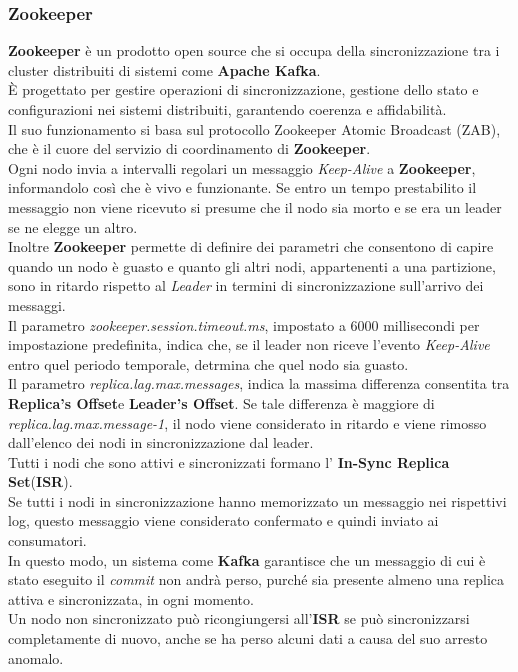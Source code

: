 \subsubsection{Zookeeper}
\textbf{Zookeeper} è un prodotto \gls{open source}{} che si occupa della sincronizzazione tra i cluster distribuiti di sistemi come \textbf{Apache Kafka}. \\
È progettato per gestire operazioni di sincronizzazione, gestione dello stato e configurazioni nei sistemi distribuiti, garantendo coerenza e affidabilità.\\
Il suo funzionamento si basa sul protocollo Zookeeper Atomic Broadcast (ZAB), che è il cuore del servizio di coordinamento di \textbf{Zookeeper}.\\
Ogni nodo invia a intervalli regolari un messaggio \textit{Keep-Alive} a \textbf{Zookeeper}, informandolo così che è vivo e funzionante. Se entro un tempo prestabilito il messaggio non viene ricevuto si presume che il nodo sia
morto e se era un leader se ne elegge un altro.\\
Inoltre \textbf{Zookeeper} permette di definire dei parametri che consentono di capire quando un nodo è guasto e quanto gli altri nodi, appartenenti a una partizione,  sono in ritardo rispetto al \textit{Leader} in termini di sincronizzazione sull'arrivo dei messaggi.\\
Il parametro \textit{zookeeper.session.timeout.ms}, impostato a 6000 millisecondi per impostazione predefinita, indica che, se il leader non riceve l'evento \textit{Keep-Alive} entro quel periodo temporale, detrmina che quel nodo sia guasto.\\
Il parametro \textit{replica.lag.max.messages}, indica la massima differenza consentita tra \textbf{Replica's Offset}e \textbf{Leader's Offset}. Se tale differenza è maggiore di \textit{replica.lag.max.message-1}, il nodo viene considerato in ritardo e viene rimosso dall'elenco dei nodi in sincronizzazione dal leader. \\
Tutti i nodi che sono attivi e sincronizzati formano l' \textbf{In-Sync Replica Set}(\textbf{ISR}).\\
Se tutti i nodi in sincronizzazione hanno memorizzato un messaggio nei rispettivi \gls{log}{}, questo messaggio viene considerato confermato e quindi inviato ai consumatori. \\
In questo modo, un sistema come \textbf{Kafka} garantisce che un messaggio di cui è stato eseguito il \textit{commit} non andrà perso, purché sia presente almeno una replica attiva e sincronizzata, in ogni momento.\\
Un nodo non sincronizzato può ricongiungersi all'\textbf{ISR} se può sincronizzarsi completamente di nuovo, anche se ha perso alcuni dati a causa del suo arresto anomalo.
